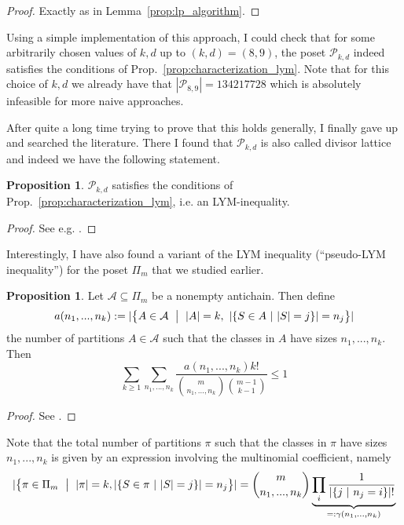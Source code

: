 \documentclass{scrartcl}
\theoremstyle{definition}
\newtheorem{proposition}[definition]{Proposition}
\begin{document}
\begin{proof}
    Exactly as in Lemma~\ref{prop:lp_algorithm}.
\end{proof}
Using a simple implementation of this approach, I could check that for some arbitrarily chosen values of $k, d$ up to $(k, d) = (8, 9)$, the poset $\mathcal{P}_{k, d}$ indeed satisfies the conditions of Prop.~\ref{prop:characterization_lym}.
Note that for this choice of $k, d$ we already have that $|\mathcal{P}_{8, 9}| = 134217728$ which is absolutely infeasible for more naive approaches.

After quite a long time trying to prove that this holds generally, I finally gave up and searched the literature.
There I found that $\mathcal{P}_{k, d}$ is also called divisor lattice and indeed we have the following statement.
\begin{proposition}
    $\mathcal{P}_{k, d}$ satisfies the conditions of Prop.~\ref{prop:characterization_lym}, i.e. an LYM-inequality.
\end{proposition}
\begin{proof}
    See e.g. \cite[Theorem 4.2.3]{anderson}.
\end{proof}
Interestingly, I have also found a variant of the LYM inequality (``pseudo-LYM inequality'') for the poset $\Pi_m$ that we studied earlier.
\begin{proposition}
    Let $\mathcal{A} \subseteq \Pi_m$ be a nonempty antichain. Then define
    \begin{equation*}
        a(n_1, ..., n_k) := |\bigl\{ A \in \mathcal{A} \ \bigm| \ |A| = k, \ |\{ S \in A \ | \ |S| = j \}| = n_j \bigr\}|
    \end{equation*}
    the number of partitions $A \in \mathcal{A}$ such that the classes in $A$ have sizes $n_1, ..., n_k$.
    Then
    \begin{equation*}
        \sum_{k \geq 1} \sum_{n_1, ..., n_k} \frac {a(n_1, ..., n_k) k!} {{m \choose n_1, ..., n_k} {m - 1 \choose k - 1}} \leq 1
    \end{equation*}
\end{proposition}
\begin{proof}
    See \cite{lym_partitions}.
\end{proof}
Note that the total number of partitions $\pi$ such that the classes in $\pi$ have sizes $n_1, ..., n_k$ is given by an expression involving the multinomial coefficient, namely
\begin{equation*}
    |\bigl\{ \pi \in \Pi_m \ \bigm| \ |\pi| = k, |\{ S \in \pi \ | \ |S| = j\}| = n_j \bigr\}| = {m \choose n_1, ..., n_k} \underbrace{ \prod_i \frac 1 {|\{ j \ | \ n_j = i\}|!} }_{=: \gamma(n_1, ..., n_k)}
\end{equation*}
\end{document}
